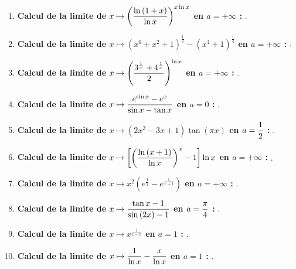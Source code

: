 \documentclass[a4paper, 11pt,reqno]{article}
\begin{document}
\begin{correction}
\begin{enumerate}
		\item \textbf{Calcul de la limite de $x\mapsto \left(  \displaystyle\frac{\ln{(1+x)}}{\ln{x}}\right)^{x\ln{x}}$ en $a=+\infty$ :}
		      .
		\item \textbf{Calcul de la limite de $x\mapsto (x^6+x^2+1)^{\frac{1}{6}}-(x^4+1)^{\frac{1}{4}}$ en $a=+\infty$ :}
		      .
		\item \textbf{Calcul de la limite de $x\mapsto \left( \displaystyle\frac{3^{\frac{1}{x}}  +4^{\frac{1}{x}} }{2} \right)^{\ln{x}}$ en $a=+\infty$ :}
		      .
		\item \textbf{Calcul de la limite de $x\mapsto \displaystyle\frac{e^{\sin{x}} -e^x  }{\sin{x}-\tan{x}}$ en $a=0$ :}
		      .
		\item \textbf{Calcul de la limite de $x\mapsto (2x^2-3x+1)\tan{(\pi x)}$ en $a=\displaystyle\frac{1}{2}$ :}
		      .
		\item \textbf{Calcul de la limite de $x\mapsto \left\lbrack \left( \displaystyle\frac{\ln{(x+1)}}{\ln{x}}   \right)^x -1\right\rbrack \ln{x}$ en $a=+\infty$ :}
		      .
		\item \textbf{Calcul de la limite de $x\mapsto x^2\left( e^{\frac{1}{x}}-e^{\frac{1}{x+1}} \right)$ en $a=+\infty$ :}
		      .
		\item \textbf{Calcul de la limite de $x\mapsto \displaystyle\frac{\tan{x}-1}{\sin{(2x)} -1}$ en $a=\displaystyle\frac{\pi}{4}$ :}
		      .
		\item \textbf{Calcul de la limite de $x\mapsto x^{\frac{1}{1-x}}$ en $a=1$ :}
		      .
		\item \textbf{Calcul de la limite de $x\mapsto \displaystyle\frac{1}{\ln{x}}- \displaystyle\frac{x}{\ln{x}}$ en $a=1$ :}
		      .
	\end{enumerate}
\end{correction}
\end{document}
